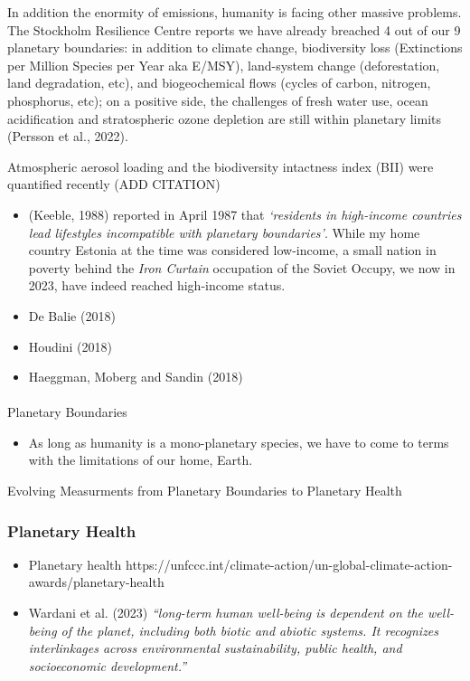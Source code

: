 \documentclass[
  letterpaper,
  DIV=11,
  numbers=noendperiod]{scrartcl}
\makeatletter
\let\oldparagraph\paragraph
\renewcommand{\paragraph}{
    \@ifstar
      \xxxParagraphStar
      \xxxParagraphNoStar
  }
\newcommand{\xxxParagraphStar}[1]{\oldparagraph*{#1}\mbox{}}
\newcommand{\xxxParagraphNoStar}[1]{\oldparagraph{#1}\mbox{}}
\providecommand{\tightlist}{%
  \setlength{\itemsep}{0pt}\setlength{\parskip}{0pt}}\usepackage{longtable,booktabs,array}
\makeatother
\begin{document}
In addition the enormity of emissions, humanity is facing other massive
problems. The Stockholm Resilience Centre reports we have already
breached 4 out of our 9 planetary boundaries: in addition to climate
change, biodiversity loss (Extinctions per Million Species per Year aka
E/MSY), land-system change (deforestation, land degradation, etc), and
biogeochemical flows (cycles of carbon, nitrogen, phosphorus, etc); on a
positive side, the challenges of fresh water use, ocean acidification
and stratospheric ozone depletion are still within planetary limits
(Persson et al., 2022).

Atmospheric aerosol loading and the biodiversity intactness index (BII)
were quantified recently (ADD CITATION)

\begin{itemize}
\tightlist
\item
  (Keeble, 1988) reported in April 1987 that \emph{`residents in
  high-income countries lead lifestyles incompatible with planetary
  boundaries'}. While my home country Estonia at the time was considered
  low-income, a small nation in poverty behind the \emph{Iron Curtain}
  occupation of the Soviet Occupy, we now in 2023, have indeed reached
  high-income status.
\item
  De Balie (2018)
\item
  Houdini (2018)
\item
  Haeggman, Moberg and Sandin (2018)
\end{itemize}

\paragraph{Planetary Boundaries}\label{planetary-boundaries}

\begin{itemize}
\tightlist
\item
  As long as humanity is a mono-planetary species, we have to come to
  terms with the limitations of our home, Earth.
\end{itemize}

Evolving Measurments from Planetary Boundaries to Planetary Health

\subsubsection{Planetary Health}\label{planetary-health}

\begin{itemize}
\item
  Planetary health
  https://unfccc.int/climate-action/un-global-climate-action-awards/planetary-health
\item
  Wardani et al. (2023) \emph{``long-term human well-being is dependent
  on the well-being of the planet, including both biotic and abiotic
  systems. It recognizes interlinkages across environmental
  sustainability, public health, and socioeconomic development.''}
\end{itemize}
\end{document}
